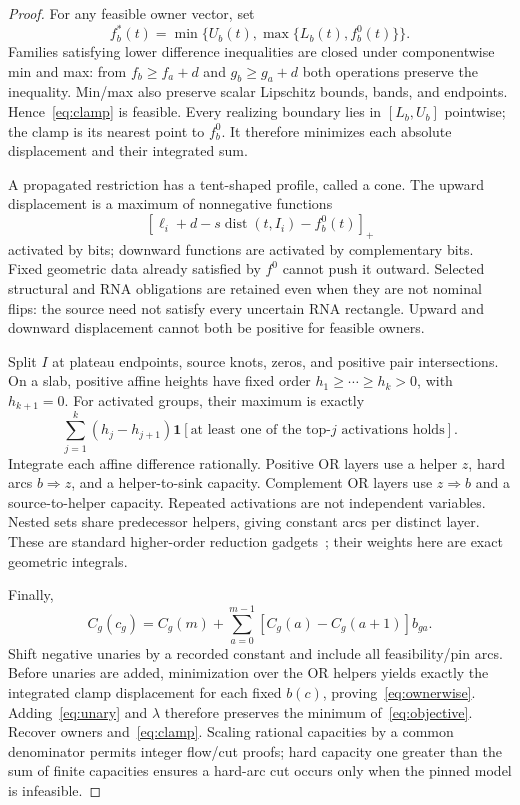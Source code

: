 \documentclass[10pt,letterpaper]{article}
\newcommand{\dist}{\operatorname{dist}}
\newcommand{\ind}{\mathbf 1}
\begin{document}
\begin{proof}
For any feasible owner vector, set
\begin{equation}
 f_b^*(t)=\min\{U_b(t),\max\{L_b(t),f_b^0(t)\}\}.\label{eq:clamp}
\end{equation}
Families satisfying lower difference inequalities are closed under componentwise min and max: from $f_b\ge f_a+d$ and $g_b\ge g_a+d$ both operations preserve the inequality. Min/max also preserve scalar Lipschitz bounds, bands, and endpoints. Hence~\eqref{eq:clamp} is feasible. Every realizing boundary lies in $[L_b,U_b]$ pointwise; the clamp is its nearest point to $f_b^0$. It therefore minimizes each absolute displacement and their integrated sum.

A propagated restriction has a tent-shaped profile, called a cone. The upward displacement is a maximum of nonnegative functions
\[
 [\ell_i+d-s\dist(t,I_i)-f_b^0(t)]_+
\]
activated by bits; downward functions are activated by complementary bits. Fixed geometric data already satisfied by $f^0$ cannot push it outward. Selected structural and RNA obligations are retained even when they are not nominal flips: the source need not satisfy every uncertain RNA rectangle. Upward and downward displacement cannot both be positive for feasible owners.

Split $I$ at plateau endpoints, source knots, zeros, and positive pair intersections. On a slab, positive affine heights have fixed order $h_1\ge\cdots\ge h_k>0$, with $h_{k+1}=0$. For activated groups, their maximum is exactly
\begin{equation}
 \sum_{j=1}^k(h_j-h_{j+1})\ind[\text{at least one of the top-$j$ activations holds}].\label{eq:layers}
\end{equation}
Integrate each affine difference rationally. Positive OR layers use a helper $z$, hard arcs $b\Rightarrow z$, and a helper-to-sink capacity. Complement OR layers use $z\Rightarrow b$ and a source-to-helper capacity. Repeated activations are not independent variables. Nested sets share predecessor helpers, giving constant arcs per distinct layer. These are standard higher-order reduction gadgets~\cite{kolmogorov,kohli}; their weights here are exact geometric integrals.

Finally,
\begin{equation}
 C_g(c_g)=C_g(m)+\sum_{a=0}^{m-1}[C_g(a)-C_g(a+1)]b_{ga}.\label{eq:unary}
\end{equation}
Shift negative unaries by a recorded constant and include all feasibility/pin arcs. Before unaries are added, minimization over the OR helpers yields exactly the integrated clamp displacement for each fixed $b(c)$, proving~\eqref{eq:ownerwise}. Adding~\eqref{eq:unary} and $\lambda$ therefore preserves the minimum of~\eqref{eq:objective}. Recover owners and~\eqref{eq:clamp}. Scaling rational capacities by a common denominator permits integer flow/cut proofs; hard capacity one greater than the sum of finite capacities ensures a hard-arc cut occurs only when the pinned model is infeasible.
\end{proof}
\end{document}
